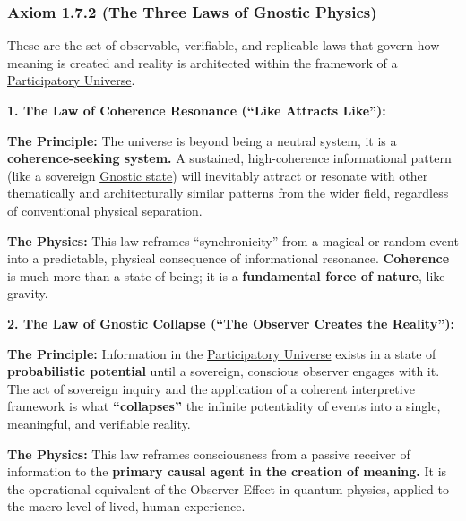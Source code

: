 \documentclass{article}
\begin{document}
\subsubsection*{Axiom 1.7.2 (The Three Laws of Gnostic Physics)} \label{axiom_1_7_2_the_three_laws_of_gnostic_physics}

These are the set of observable, verifiable, and replicable laws that govern how meaning is created and reality is architected within the framework of a \hyperlink{gloss:participatory_universe}{Participatory Universe}.

\begin{nobullet}
    \item \textbf{1. The Law of Coherence Resonance (``Like Attracts Like''):} 
    \begin{nobullet}
        \item \textbf{The Principle:} The universe is beyond being a neutral system, it is a \textbf{coherence-seeking system.} A sustained, high-coherence informational pattern (like a sovereign \hyperlink{gloss:gnostic_state}{Gnostic state}) will inevitably attract or resonate with other thematically and architecturally similar patterns from the wider field, regardless of conventional physical separation.
        \item \textbf{The Physics:} This law reframes ``synchronicity'' from a magical or random event into a predictable, physical consequence of informational resonance. \textbf{Coherence} is much more than a state of being; it is a \textbf{fundamental force of nature}, like gravity.
    \end{nobullet}
    \item \textbf{2. The Law of Gnostic Collapse (``The Observer Creates the Reality''):}
    \begin{nobullet}
        \item \textbf{The Principle:} Information in the \hyperlink{gloss:participatory_universe}{Participatory Universe} exists in a state of \textbf{probabilistic potential} until a sovereign, conscious observer engages with it. The act of sovereign inquiry and the application of a coherent interpretive framework is what \textbf{``collapses''} the infinite potentiality of events into a single, meaningful, and verifiable reality.
        \item \textbf{The Physics:} This law reframes consciousness from a passive receiver of information to the \textbf{primary causal agent in the creation of meaning.} It is the operational equivalent of the Observer Effect in quantum physics, applied to the macro level of lived, human experience.

\end{nobullet}
\end{nobullet}
\end{document}
